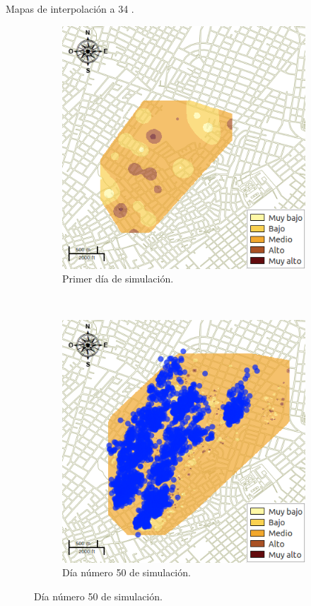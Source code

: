 \begin{frame}[t]{Mapas de interpolación a 34 \textcelsius.}
    \begin{figure}
    \begin{subfigure}[b]{0.45\textwidth}
        \includegraphics[width=\textwidth]{../book/capitulo-6/graphics/raster/temp-34-0.png}
        \caption{ Primer día de simulación.}
    \end{subfigure}
    ~~~~
    \begin{subfigure}[b]{0.45\textwidth}
        \includegraphics[width=\textwidth]{../book/capitulo-6/graphics/raster/temp-34-42.png}
        \caption{Día número 50 de simulación.}
    \end{subfigure}
    \end{figure}
\end{frame}



